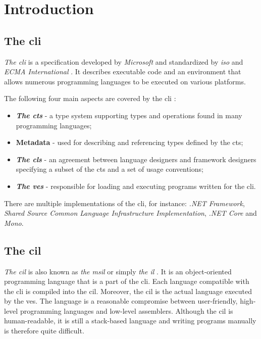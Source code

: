 \documentclass[declaration,shortabstract,english,mgr]{iithesis}
\begin{document}
\chapter{Introduction}

\section{The \acrlong{cli}}

\textit{The \acrfull{cli}} is a specification developed by \textit{Microsoft} and standardized by \textit{\acrshort{iso}} and \textit{ECMA International} \cite{isoStandard, ecmaStandard}. It describes executable code and an environment that allows numerous programming languages to be executed on various platforms.

The following four main aspects are covered by the \acrlong{cli} \cite{ecmaStandard}:
\begin{itemize}
	\item{
		\textbf{\textit{The \acrfull{cts}}} - a type system supporting types and operations found in many programming languages;
	}
	\item{
		\textbf{Metadata} - used for describing and referencing types defined by the \acrshort{cts};
	}
	\item{
		\textbf{\textit{The \acrfull{cls}}} - an agreement between language designers and framework designers specifying a subset of the \acrshort{cts} and a set of usage conventions;
	}
	\item{
		\textbf{\textit{The \acrfull{ves}}} - responsible for loading and executing programs written for the \acrshort{cli}.
	}
\end{itemize}

There are multiple implementations of the \acrshort{cli}, for instance: \textit{.NET Framework}, \textit{Shared Source Common Language Infrastructure Implementation}, \textit{.NET Core} and \textit{Mono}.

\section{The \acrlong{cil}}

\textit{The \acrfull{cil}} is also known as \textit{the \acrfull{msil}} or simply \textit{the \acrfull{il}} \cite{procsharp7}. It is an object-oriented programming language that is a part of the \acrshort{cli}. Each language compatible with the \acrshort{cli} is compiled into the \acrshort{cil}. Moreover, the \acrshort{cil} is the actual language executed by the \acrshort{ves}. The language is a reasonable compromise between user-friendly, high-level programming languages and low-level assemblers. Although the \acrshort{cil} is human-readable, it is still a stack-based language and writing programs manually is therefore quite difficult.
\end{document}
